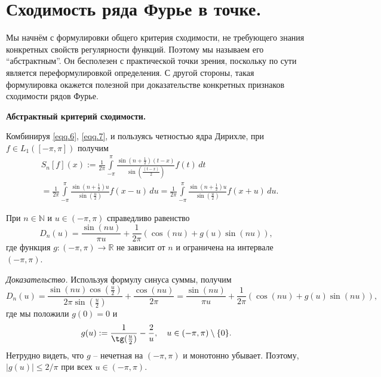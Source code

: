 \section{Сходимость ряда Фурье в точке.}

Мы начнём с формулировки общего критерия сходимости, не требующего знания конкретных свойств регулярности функций. Поэтому мы называем его ``абстрактным''. 
Он бесполезен с практической точки зрения, поскольку по сути является переформулировкой определения. С другой стороны, такая формулировка окажется полезной при доказательстве конкретных
признаков сходимости рядов Фурье. 

\textbf{Абстрактный критерий сходимости.}

Комбинируя \eqref{eqq.6}, \eqref{eqq.7}, и пользуясь четностью ядра Дирихле, при $f \in L_{1}([-\pi,\pi])$ получим
\begin{equation}
	\label{eqq.19}
	\begin{split}
		&S_{n}[f](x):=\frac{1}{2\pi}\int\limits_{-\pi}^{\pi}\frac{\sin(n+\frac{1}{2})(t-x)}{\sin(\frac{(t-x)}{2})}f(t)\,dt \\
		&=\frac{1}{2\pi}\int\limits_{-\pi}^{\pi}\frac{\sin(n+\frac{1}{2})u}{\sin(\frac{u}{2})}f(x-u)\,du =
		\frac{1}{2\pi}\int\limits_{-\pi}^{\pi}\frac{\sin(n+\frac{1}{2})u}{\sin(\frac{u}{2})}f(x+u)\,du.
	\end{split}
\end{equation}

\begin{lemma}
	\label{Lm.convenient_form}
	При $n \in \mathbb{N}$ и $u \in (-\pi,\pi)$ справедливо равенство
	\begin{equation}
		D_{n}(u) = \frac{\sin(nu)}{\pi u} + \frac{1}{2\pi}(\cos(nu)+g(u)\sin(nu)),
	\end{equation}
	где функция $g:(-\pi,\pi) \to \mathbb{R}$ не зависит от $n$ и ограничена на интервале $(-\pi,\pi)$.
\end{lemma}

\textit{Доказательство.} Используя формулу синуса суммы, получим
\begin{equation}
	D_{n}(u)=\frac{\sin(nu)\cos(\frac{u}{2})}{2\pi\sin(\frac{u}{2})} + \frac{\cos(nu)}{2\pi} = \frac{\sin(nu)}{\pi u}+\frac{1}{2\pi}(\cos(nu)+g(u)\sin(nu)),
\end{equation}
где мы положили $g(0)=0$ и
$$
g(u):=\frac{1}{\tg(\frac{u}{2})}-\frac{2}{u}, \quad u \in (-\pi,\pi) \setminus \{0\}.
$$
Нетрудно видеть, что $g$  -- нечетная на $(-\pi,\pi)$ и монотонно убывает. Поэтому, $|g(u)| \le 2/\pi$ при всех $u \in (-\pi,\pi)$.

